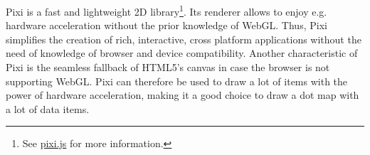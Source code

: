 \ac{Pixi} is a fast and lightweight 2D library\footnote{See \href{http://www.pixijs.com/}{pixi.js} for more information.}. Its renderer allows to enjoy e.g. hardware acceleration without the prior knowledge of \ac{WebGL}. Thus, \ac{Pixi} simplifies the creation of rich, interactive, cross platform applications without the need of knowledge of browser and device compatibility. Another characteristic of \ac{Pixi} is the seamless fallback of HTML5's canvas in case the browser is not supporting \ac{WebGL}.
\ac{Pixi} can therefore be used to draw a lot of items with the power of hardware acceleration, making it a good choice to draw a dot map with a lot of data items.